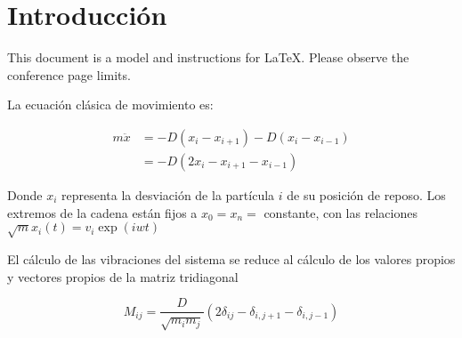 \section{Introducción}
This document is a model and instructions for \LaTeX.
Please observe the conference page limits. 

La ecuación clásica de movimiento es:

\begin{align*}
	m \ddot x & = -D(x_i - x_{i+1}) - D(x_i - x_{i-1}) \\
	          & = -D(2x_i - x_{i+1} - x_{i-1})         
\end{align*}

Donde $x_i$ representa la desviación de la partícula $i$ de su posición de reposo. Los extremos de la cadena están fijos a $x_0 = x_n = $ constante, con las relaciones $\sqrt{m} x_i(t) = v_i \exp(iwt)$

El cálculo de las vibraciones del sistema se reduce al cálculo de los valores propios y vectores propios de la matriz tridiagonal

\begin{equation*}
	M_{ij} = \frac{D}{\sqrt{m_i m_j}} (2 \delta_{ij} - \delta_{i, j+1} - \delta_{i, j-1}) 
\end{equation*}


